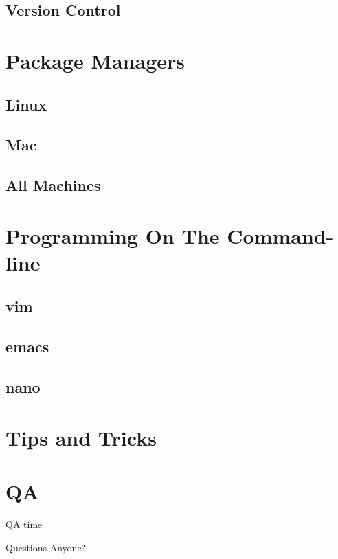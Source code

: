 \documentclass[10pt]{beamer}
\begin{document}
\subsection{Version Control}

\section{Package Managers}

\subsection{Linux}

\subsection{Mac}

\subsection{All Machines}

\section{Programming On The Command-line}
\subsection{vim}
\subsection{emacs}
\subsection{nano}

\section{Tips and Tricks}

\section{QA}
\begin{frame}{QA time}
  \begin{center}
    Questions Anyone?
  \end{center}
\end{frame}
\end{document}
